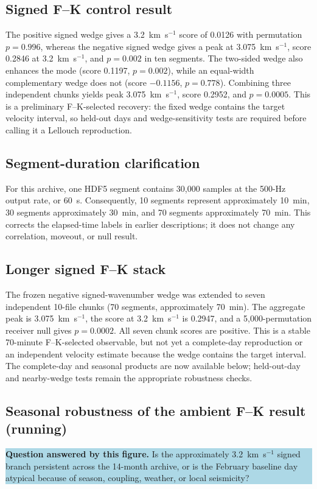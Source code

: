 \documentclass[11pt]{article}
\newcommand{\figquestion}[1]{\par\medskip\noindent\colorbox{lightblue}{\parbox{0.95\linewidth}{\textcolor{questionblue}{\textbf{Question answered by this figure.}} #1}}\par\medskip}
\begin{document}
\subsection{Signed F--K control result}
The positive signed wedge gives a 3.2~km~s$^{-1}$ score of 0.0126 with permutation $p=0.996$, whereas the negative signed wedge gives a peak at 3.075~km~s$^{-1}$, score 0.2846 at 3.2~km~s$^{-1}$, and $p=0.002$ in ten segments. The two-sided wedge also enhances the mode (score 0.1197, $p=0.002$), while an equal-width complementary wedge does not (score $-0.1156$, $p=0.778$). Combining three independent chunks yields peak 3.075~km~s$^{-1}$, score 0.2952, and $p=0.0005$. This is a preliminary F--K-selected recovery: the fixed wedge contains the target velocity interval, so held-out days and wedge-sensitivity tests are required before calling it a Lellouch reproduction.


\subsection{Segment-duration clarification}
For this archive, one HDF5 segment contains 30,000 samples at the 500-Hz output rate, or 60~s. Consequently, 10 segments represent approximately 10~min, 30 segments approximately 30~min, and 70 segments approximately 70~min. This corrects the elapsed-time labels in earlier descriptions; it does not change any correlation, moveout, or null result.


\subsection{Longer signed F--K stack}
The frozen negative signed-wavenumber wedge was extended to seven independent 10-file chunks (70 segments, approximately 70~min). The aggregate peak is 3.075~km~s$^{-1}$, the score at 3.2~km~s$^{-1}$ is 0.2947, and a 5,000-permutation receiver null gives $p=0.0002$. All seven chunk scores are positive. This is a stable 70-minute F--K-selected observable, but not yet a complete-day reproduction or an independent velocity estimate because the wedge contains the target interval. The complete-day and seasonal products are now available below; held-out-day and nearby-wedge tests remain the appropriate robustness checks.


\subsection{Seasonal robustness of the ambient F--K result (running)}
\figquestion{Is the approximately 3.2~km~s$^{-1}$ signed branch persistent across the 14-month archive, or is the February baseline day atypical because of season, coupling, weather, or local seismicity?}
\end{document}
